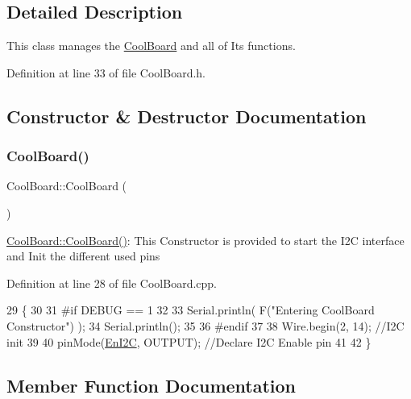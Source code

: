 \subsection{Detailed Description}
This class manages the \hyperlink{class_cool_board}{Cool\+Board} and all of Its functions. 

Definition at line 33 of file Cool\+Board.\+h.



\subsection{Constructor \& Destructor Documentation}
\mbox{\label{class_cool_board_a8b88fd781e22e93025dd63474113b7e4}} 
\subsubsection{\texorpdfstring{Cool\+Board()}{CoolBoard()}}
{\footnotesize\ttfamily Cool\+Board\+::\+Cool\+Board (\begin{DoxyParamCaption}{ }\end{DoxyParamCaption})}

\hyperlink{class_cool_board_a8b88fd781e22e93025dd63474113b7e4}{Cool\+Board\+::\+Cool\+Board()}\+: This Constructor is provided to start the I2C interface and Init the different used pins 

Definition at line 28 of file Cool\+Board.\+cpp.


\begin{DoxyCode}
29 \{
30 
31 \textcolor{preprocessor}{#if DEBUG == 1}
32 
33     Serial.println( F(\textcolor{stringliteral}{"Entering CoolBoard Constructor"}) );
34     Serial.println();
35 
36 \textcolor{preprocessor}{#endif}
37     
38     Wire.begin(2, 14);                       \textcolor{comment}{//I2C init }
39 
40     pinMode(\hyperlink{class_cool_board_af1fe1376fc66f93dee80b327ca695377}{EnI2C}, OUTPUT);           \textcolor{comment}{//Declare I2C Enable pin }
41 
42 \}
\end{DoxyCode}


\subsection{Member Function Documentation}
\mbox{\label{class_cool_board_acba7c5aef7268b2c0044bdb54d3b9d76}} 
